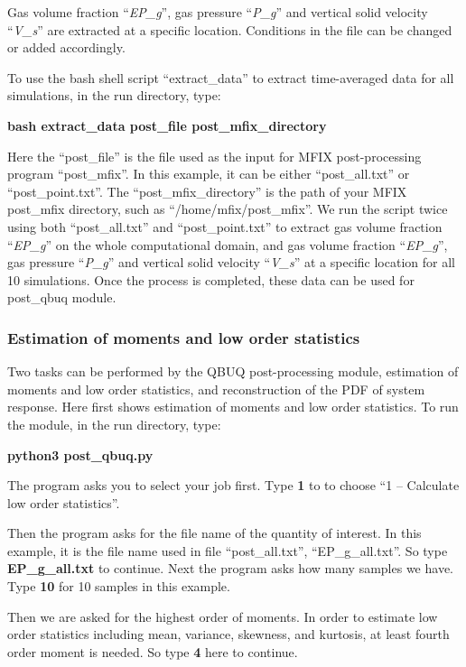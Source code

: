 \documentclass[a4paper,12pt,titlepage]{article}
\begin{document}
Gas volume fraction ``\emph{EP\_g}'', gas pressure ``\emph{P\_g}'' and vertical
solid velocity ``\emph{V\_s}'' are extracted at a specific location. Conditions
in the file can be changed or added accordingly.

To use the bash shell script ``extract\_data'' to extract time-averaged data for
all simulations, in the run directory, type:

\textbf{bash extract\_data post\_file post\_mfix\_directory}

Here the ``post\_file'' is the file used as the input for MFIX post-processing
program ``post\_mfix''. In this example, it can be either ``post\_all.txt'' or
``post\_point.txt''. The ``post\_mfix\_directory'' is the path of your MFIX
post\_mfix directory, such as ``/home/mfix/post\_mfix''. We run the script
twice using both ``post\_all.txt'' and ``post\_point.txt'' to extract gas 
volume fraction ``\emph{EP\_g}'' on the whole computational domain, and gas
volume fraction ``\emph{EP\_g}'', gas pressure ``\emph{P\_g}'' and vertical
solid velocity ``\emph{V\_s}'' at a specific location for all 10 simulations. 
Once the process is completed, these data can be used for post\_qbuq module.

\subsubsection{Estimation of moments and low order statistics}
\label{sec:LowOrder}

Two tasks can be performed by the QBUQ post-processing module, estimation of 
moments and low order statistics, and reconstruction of the PDF of system
response. Here first shows estimation of moments and low order statistics. 
To run the module, in the run directory, type:

\textbf{python3 post\_qbuq.py}

The program asks you to select your job first. Type \textbf{1} to to choose
``1 -- Calculate low order statistics''.

Then the program asks for the file name of the quantity of interest. In this 
example, it is the file name used in file ``post\_all.txt'', ``EP\_g\_all.txt''.
So type \textbf{EP\_g\_all.txt} to continue. Next the program asks how many 
samples we have. Type \textbf{10} for 10 samples in this example.

Then we are asked for the highest order of moments. In order to estimate low
order statistics including mean, variance, skewness, and kurtosis, at least 
fourth order moment is needed. So type \textbf{4} here to continue.
\end{document}
